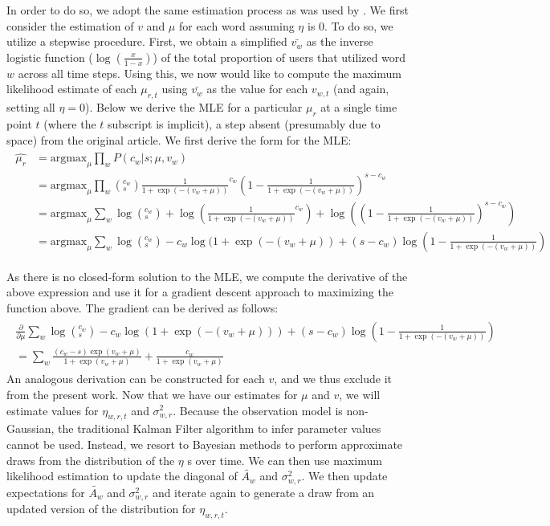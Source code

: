In order to do so, we adopt the same estimation process as was used by \cite{eisenstein_diffusion_2014}. We first consider the estimation of $v$ and $\mu$ for each word assuming $\eta$ is 0.  To do so, we utilize a stepwise procedure.  First, we obtain a simplified $\bar{v_w}$ as the inverse logistic function ($\log(\frac{x}{1-x})$) of the total proportion of users that utilized word $w$ across all time steps. Using this, we now would like to compute the maximum likelihood estimate of each $\mu_{r,t}$ using $\bar{v_w}$ as the value for each $v_{w,t}$ (and again, setting all $\eta = 0$).   Below we derive the MLE for a particular $\mu_r$ at a single time point $t$ (where the $t$ subscript is implicit), a step absent (presumably due to space) from the original article.  We first derive the form for the MLE:
\begin{align}
\begin{split}
  \hat{\mu_r} &= \mathrm{argmax}_{\mu} \prod_w P(c_w | s; \mu, v_w) \\
  &= \mathrm{argmax}_{\mu} \prod_w   ({}^{c_w}_{s}) \frac{1}{1+\exp(-(v_w+\mu))}^{c_w} (1- \frac{1}{ 1+\exp(-(v_w+\mu))})^{s-c_w} \\
  &= \mathrm{argmax}_{\mu} \sum_w \log({}^{c_w}_{s})  + \log(\frac{1}{1+ \exp(-(v_w+\mu))}^{c_w}) + \log( (1- \frac{1}{ 1+ \exp(-(v_w+\mu))})^{s-c_w}) \\
  &= \mathrm{argmax}_{\mu}  \sum_w \log({}^{c_w}_{s})  - c_w \log(1+ \exp(-(v_w+\mu)) + (s-c_w) \log (1- \frac{1}{ 1+ \exp(-(v_w+\mu))})
  \end{split}
\end{align}

As there is no closed-form solution to the MLE, we compute the derivative of the above expression and use it for a gradient descent approach to maximizing the function above.  The gradient can be derived as follows:
\begin{align}
\begin{split}
 \frac{\partial}{\partial \mu} \sum_w \log({}^{c_w}_{s})  - c_w \log(1+ \exp(-(v_w+\mu))) + (s-c_w) \log (1- \frac{1}{ 1+ \exp(-(v_w+\mu))}) \\
  =  \sum_w \frac{(c_w-s) \exp(v_w+\mu)}{ 1+ \exp(v_w+\mu)} +\frac{c_w}{1+ \exp(v_w+\mu)} 
  \end{split} 
\end{align}
An analogous derivation can be constructed for each $v$, and we thus exclude it from the present work. Now that we have our estimates for $\mu$ and $v$, we will estimate values for $\eta_{w,r,t}$ and $\sigma^2_{w,r}$. Because the observation model is non-Gaussian, the traditional Kalman Filter algorithm to infer parameter values cannot be used. Instead, we resort to Bayesian methods to perform approximate draws from the distribution of the $\eta$ s over time. We can then use maximum likelihood estimation to update the diagonal of $\tilde{A_w}$ and $\sigma^2_{w,r}$.  We then update expectations for $\tilde{A_w}$ and $\sigma^2_{w,r}$ and iterate again to generate a draw from an updated version of the distribution for $\eta_{w,r,t}$. 

